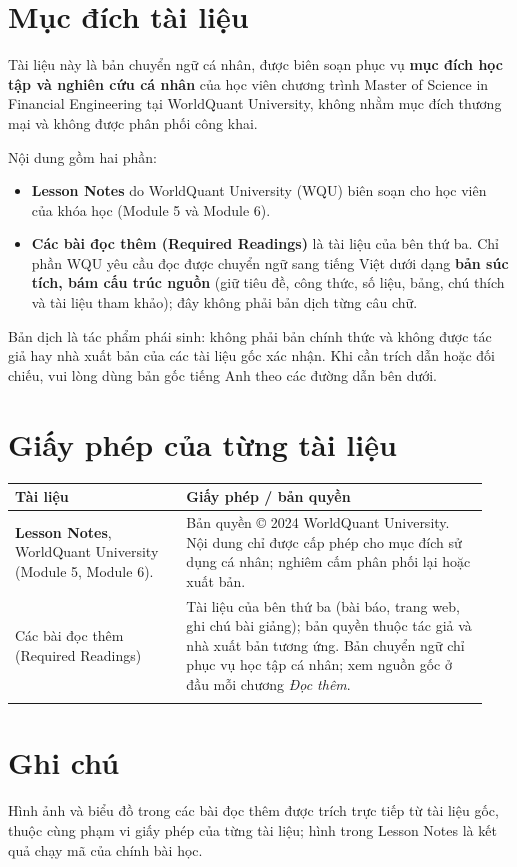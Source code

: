 

\thispagestyle{empty}

\section*{Mục đích tài liệu}

Tài liệu này là bản chuyển ngữ cá nhân, được biên soạn phục vụ \textbf{mục đích học tập và nghiên cứu cá nhân} của học viên chương trình Master of Science in Financial Engineering tại WorldQuant University, không nhằm mục đích thương mại và không được phân phối công khai.

Nội dung gồm hai phần:
\begin{itemize}
  \item \textbf{Lesson Notes} do WorldQuant University (WQU) biên soạn cho học viên của khóa học (Module 5 và Module 6).
  \item \textbf{Các bài đọc thêm (Required Readings)} là tài liệu của bên thứ ba. Chỉ phần WQU yêu cầu đọc được chuyển ngữ sang tiếng Việt dưới dạng \textbf{bản súc tích, bám cấu trúc nguồn} (giữ tiêu đề, công thức, số liệu, bảng, chú thích và tài liệu tham khảo); đây không phải bản dịch từng câu chữ.
\end{itemize}

Bản dịch là tác phẩm phái sinh: không phải bản chính thức và không được tác giả hay nhà xuất bản của các tài liệu gốc xác nhận. Khi cần trích dẫn hoặc đối chiếu, vui lòng dùng bản gốc tiếng Anh theo các đường dẫn bên dưới.

\section*{Giấy phép của từng tài liệu}

{\small
\renewcommand{\arraystretch}{1.25}
\begin{longtable}{>{\raggedright\arraybackslash}p{0.34\linewidth}>{\raggedright\arraybackslash}p{0.60\linewidth}}
\toprule
\textbf{Tài liệu} & \textbf{Giấy phép / bản quyền} \\
\midrule
\endhead
\textbf{Lesson Notes}, WorldQuant University (Module 5, Module 6). &
Bản quyền © 2024 WorldQuant University. Nội dung chỉ được cấp phép cho mục đích sử dụng cá nhân; nghiêm cấm phân phối lại hoặc xuất bản. \\
\addlinespace
Các bài đọc thêm (Required Readings) & Tài liệu của bên thứ ba (bài báo, trang web, ghi chú bài giảng); bản quyền thuộc tác giả và nhà xuất bản tương ứng. Bản chuyển ngữ chỉ phục vụ học tập cá nhân; xem nguồn gốc ở đầu mỗi chương \textit{Đọc thêm}. \\
\addlinespace
\bottomrule
\end{longtable}
}

\section*{Ghi chú}

Hình ảnh và biểu đồ trong các bài đọc thêm được trích trực tiếp từ tài liệu gốc, thuộc cùng phạm vi giấy phép của từng tài liệu; hình trong Lesson Notes là kết quả chạy mã của chính bài học.
